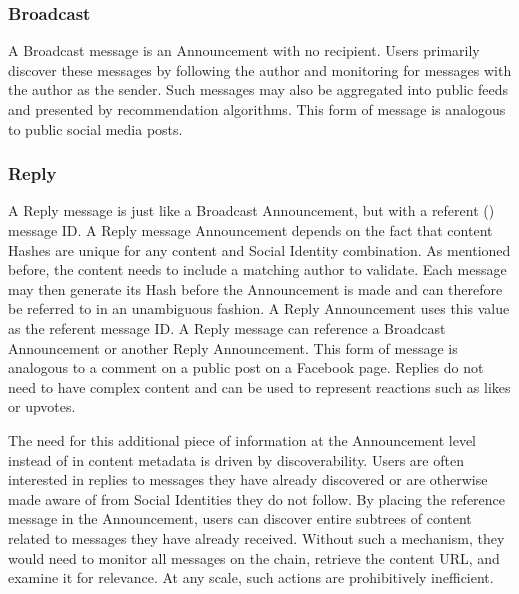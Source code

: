 \documentclass[12pt,letterpaper]{article}
\begin{document}
\subsubsection{Broadcast}

A Broadcast message is an Announcement with no recipient. Users primarily discover these
messages by following the author and monitoring for messages with the author as the
sender. Such messages may also be aggregated into public feeds and presented by
recommendation algorithms. This form of message is analogous to public social media posts.

\subsubsection{Reply}

A Reply message is just like a Broadcast Announcement, but with a referent () message ID. A Reply message Announcement depends on the fact that content Hashes are
unique for any content and Social Identity combination. As mentioned before, the content
needs to include a matching author to validate. Each message may then generate its Hash
before the Announcement is made and can therefore be referred to in an unambiguous
fashion. A Reply Announcement uses this value as the referent message ID. A Reply message
can reference a Broadcast Announcement or another Reply Announcement. This form of message
is analogous to a comment on a public post on a Facebook page. Replies do not need to have
complex content and can be used to represent reactions such as likes or upvotes.

The need for this additional piece of information at the Announcement level instead of in
content metadata is driven by discoverability. Users are often interested in replies to
messages they have already discovered or are otherwise made aware of from Social Identities
they do not follow. By placing the reference message in the Announcement, users can discover
entire subtrees of content related to messages they have already received.  Without such a
mechanism, they would need to monitor all messages on the chain, retrieve the content URL,
and examine it for relevance. At any scale, such actions are prohibitively inefficient.
\end{document}
